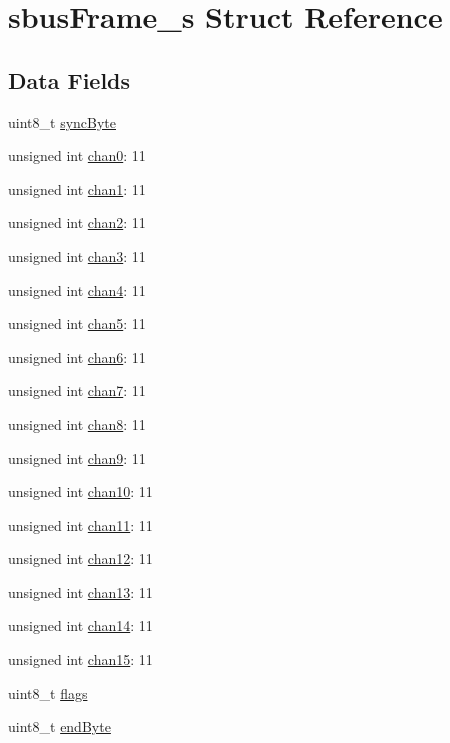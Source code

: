 \hypertarget{structsbusFrame__s}{\section{sbus\+Frame\+\_\+s Struct Reference}
\label{structsbusFrame__s}
}
\subsection*{Data Fields}
\begin{DoxyCompactItemize}
\item 
uint8\+\_\+t \hyperlink{structsbusFrame__s_aed468b9a9352df61b0cb3b7f48614980}{sync\+Byte}
\item 
unsigned int \hyperlink{structsbusFrame__s_a7ecee6aa1a5784292008bd84cf1fa14a}{chan0}\+: 11
\item 
unsigned int \hyperlink{structsbusFrame__s_a4a4224c1a0d186c167b3c219d91e5c34}{chan1}\+: 11
\item 
unsigned int \hyperlink{structsbusFrame__s_a11f091edfa6defd6e176f57bd8821d5d}{chan2}\+: 11
\item 
unsigned int \hyperlink{structsbusFrame__s_acf064bfd4924f5fb5af3e1178d47b90c}{chan3}\+: 11
\item 
unsigned int \hyperlink{structsbusFrame__s_a52c271d99b1d7ea65119a48b87245767}{chan4}\+: 11
\item 
unsigned int \hyperlink{structsbusFrame__s_a5eb204c42032fd9722e8444ceeda6d38}{chan5}\+: 11
\item 
unsigned int \hyperlink{structsbusFrame__s_a57573a7c617b921f0a39804b54ced3fb}{chan6}\+: 11
\item 
unsigned int \hyperlink{structsbusFrame__s_adcced9fecb0005b0786f9bc458cc967b}{chan7}\+: 11
\item 
unsigned int \hyperlink{structsbusFrame__s_a38b6b01145923fc928c77233dd24d47f}{chan8}\+: 11
\item 
unsigned int \hyperlink{structsbusFrame__s_a83f4b7baf7e51edaa64f9cef4b61ab2c}{chan9}\+: 11
\item 
unsigned int \hyperlink{structsbusFrame__s_a3e8aa24646843005d8f55f559e214464}{chan10}\+: 11
\item 
unsigned int \hyperlink{structsbusFrame__s_a796d323ee0ffbfdcdd604ad8199b3ff9}{chan11}\+: 11
\item 
unsigned int \hyperlink{structsbusFrame__s_ad87ace3bd4ed8f63fbe298f1b50bf468}{chan12}\+: 11
\item 
unsigned int \hyperlink{structsbusFrame__s_ad123c210ce296838ae022e99e0b8e372}{chan13}\+: 11
\item 
unsigned int \hyperlink{structsbusFrame__s_aaafe223234b82041d767602022fc029f}{chan14}\+: 11
\item 
unsigned int \hyperlink{structsbusFrame__s_a661d352bbd58a7b04ec702476dda70e8}{chan15}\+: 11
\item 
uint8\+\_\+t \hyperlink{structsbusFrame__s_a25c718cf2d3caebc9847064355c3c018}{flags}
\item 
uint8\+\_\+t \hyperlink{structsbusFrame__s_a166b7f852fde475228d021eb57cacd39}{end\+Byte}
\end{DoxyCompactItemize}


